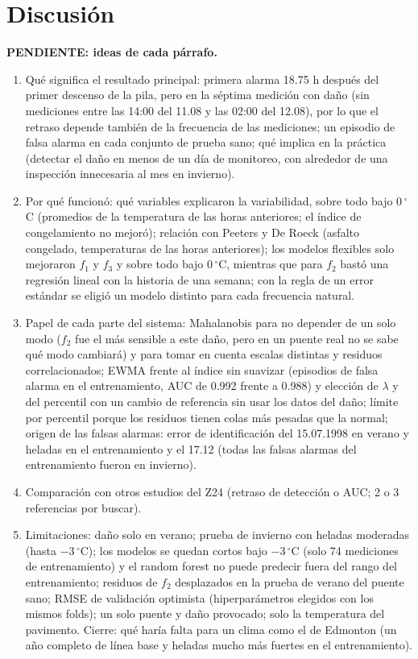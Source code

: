 \documentclass[9pt,twocolumn,twoside]{opticajnl}
\begin{document}
\section{Discusión}
\textbf{PENDIENTE: ideas de cada párrafo.}
\begin{enumerate}
\item Qué significa el resultado principal: primera alarma 18.75 h después del primer descenso de la pila, pero en la séptima medición con daño (sin mediciones entre las 14:00 del 11.08 y las 02:00 del 12.08), por lo que el retraso depende también de la frecuencia de las mediciones; un episodio de falsa alarma en cada conjunto de prueba sano; qué implica en la práctica (detectar el daño en menos de un día de monitoreo, con alrededor de una inspección innecesaria al mes en invierno).
\item Por qué funcionó: qué variables explicaron la variabilidad, sobre todo bajo $0\,^\circ$C (promedios de la temperatura de las horas anteriores; el índice de congelamiento no mejoró); relación con Peeters y De Roeck (asfalto congelado, temperaturas de las horas anteriores); los modelos flexibles solo mejoraron $f_1$ y $f_3$ y sobre todo bajo $0\,^\circ$C, mientras que para $f_2$ bastó una regresión lineal con la historia de una semana; con la regla de un error estándar se eligió un modelo distinto para cada frecuencia natural.
\item Papel de cada parte del sistema: Mahalanobis para no depender de un solo modo ($f_2$ fue el más sensible a este daño, pero en un puente real no se sabe qué modo cambiará) y para tomar en cuenta escalas distintas y residuos correlacionados; EWMA frente al índice sin suavizar (episodios de falsa alarma en el entrenamiento, AUC de 0.992 frente a 0.988) y elección de $\lambda$ y del percentil con un cambio de referencia sin usar los datos del daño; límite por percentil porque los residuos tienen colas más pesadas que la normal; origen de las falsas alarmas: error de identificación del 15.07.1998 en verano y heladas en el entrenamiento y el 17.12 (todas las falsas alarmas del entrenamiento fueron en invierno).
\item Comparación con otros estudios del Z24 (retraso de detección o AUC; 2 o 3 referencias por buscar).
\item Limitaciones: daño solo en verano; prueba de invierno con heladas moderadas (hasta $-3\,^\circ$C); los modelos se quedan cortos bajo $-3\,^\circ$C (solo 74 mediciones de entrenamiento) y el random forest no puede predecir fuera del rango del entrenamiento; residuos de $f_2$ desplazados en la prueba de verano del puente sano; RMSE de validación optimista (hiperparámetros elegidos con los mismos folds); un solo puente y daño provocado; solo la temperatura del pavimento. Cierre: qué haría falta para un clima como el de Edmonton (un año completo de línea base y heladas mucho más fuertes en el entrenamiento).
\end{enumerate}
\end{document}
